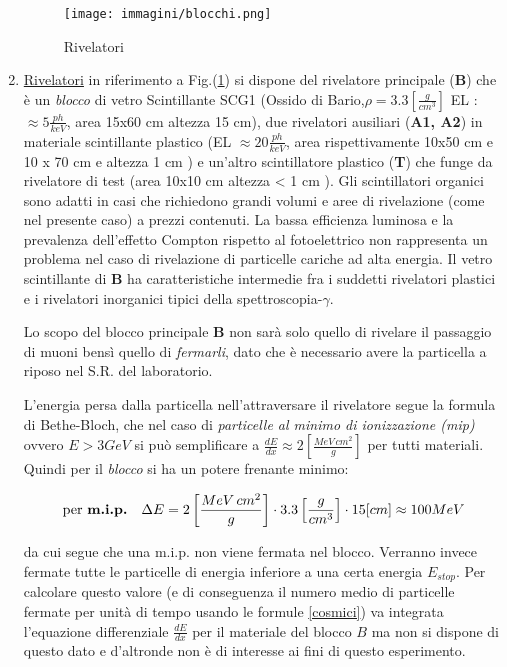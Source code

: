\documentclass[12pt,a4paper,openright,twoside]{article}
\numberwithin{equation}{section} %
\begin{document}
\begin{enumerate}


\begin{figure}[hbtp]
\centering
\texttt{[image: immagini/blocchi.png]}
\caption{Rivelatori}
\label{riv}
\end{figure}


\item \underline{Rivelatori}\label{riv} in riferimento a Fig.(\ref{riv}) si dispone del rivelatore principale (\textbf{B}) che è un \textit{blocco} di vetro Scintillante SCG1 (Ossido di Bario,$\rho = 3.3 \left[ \frac{g}{cm^3} \right]$ EL : $ \approx 5 \frac{ph}{keV}$, area 15x60 cm altezza 15 cm), due rivelatori ausiliari (\textbf{A1, A2}) in materiale scintillante plastico (EL  $\approx 20 \frac{ph}{keV}$, area rispettivamente 10x50 cm e 10 x 70 cm e  altezza 1 cm ) e un'altro scintillatore plastico (\textbf{T}) che funge da rivelatore di test (area 10x10 cm altezza < 1 cm ).
Gli scintillatori organici sono adatti in casi che richiedono grandi volumi e aree di rivelazione (come nel presente caso) a prezzi contenuti. La bassa efficienza luminosa e la prevalenza dell'effetto Compton rispetto al fotoelettrico non rappresenta un problema nel caso di rivelazione di particelle cariche ad alta energia.
Il vetro scintillante di \textbf{B} ha caratteristiche intermedie fra i suddetti rivelatori plastici e i rivelatori inorganici tipici della spettroscopia-$\gamma$.

Lo scopo del blocco principale \textbf{B} non sarà solo quello di rivelare il passaggio di muoni bensì quello di \textit{fermarli}, dato che è necessario avere la particella a riposo nel S.R. del laboratorio.

 L'energia persa dalla particella nell'attraversare il rivelatore segue la formula di Bethe-Bloch, che nel caso di \textit{particelle al minimo di ionizzazione (mip)} ovvero $E> 3 GeV $ si può semplificare a $\frac{dE}{dx} \approx 2 \left[ \frac{MeV \, cm^2}{g} \right]$ per tutti materiali.  Quindi per il \textit{blocco} si ha un potere frenante minimo:

\begin{equation}\label{enmu}
\text{per \textbf{m.i.p.}} \quad \Delta E = 2 \left[ \frac{MeV \, cm^2}{g} \right] \cdot 3.3 \left[ \frac{g}{cm^3} \right] \cdot 15 [cm] \approx 100  MeV
\end{equation}

da cui segue che una m.i.p. non viene fermata nel blocco.
Verranno invece fermate tutte le particelle di energia inferiore a una certa energia $E_{stop}$. Per calcolare questo valore (e di conseguenza il numero medio di particelle fermate per unità di tempo usando le formule \ref{cosmici}) va integrata l'equazione differenziale $\frac{dE}{dx}$ per il materiale del blocco $B$ ma non si dispone di questo dato e d'altronde non è di interesse ai fini di questo esperimento.


\end{enumerate}
\end{document}
